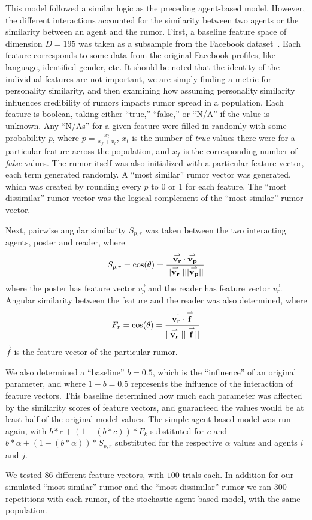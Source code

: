 This model followed a similar logic as the preceding agent-based model.
However, the different interactions accounted for the similarity between two agents or the similarity between an agent and the rumor.
First, a baseline feature space of dimension $ D = 195 $ was taken as a subsample from the Facebook dataset~\cite{mcauley-2014}.
Each feature corresponds to some data from the original Facebook profiles, like language, identified gender, etc.
It should be noted that the identity of the individual features are not important, we are simply finding a metric for personality similarity, and then examining how assuming personality similarity influences credibility of rumors impacts rumor spread in a population.
Each feature is boolean, taking either ``true,'' ``false,'' or ``N/A'' if the value is unknown.
Any ``N/As'' for a given feature were filled in randomly with some probability $ p $, where $ p = \frac{x_{t}}{x_{f} + x_{t}} $, $ x_{t} $ is the number of \textit{true} values there were for a particular feature across the population, and $ x_{f} $ is the corresponding number of \textit{false} values.
The rumor itself was also initialized with a particular feature vector, each term generated randomly.
A ``most similar'' rumor vector was generated, which was created by rounding every $ p $ to 0 or 1 for each feature.
The ``most dissimilar'' rumor vector was the logical complement of the ``most similar'' rumor vector.

Next, pairwise angular similarity $ S_{p,r} $ was taken between the two interacting agents, poster and reader, where
$$ S_{p,r} = \cos(\theta) = \frac{\overset{\rightharpoonup}{\mathbf{v_r}}\cdot\overset{\rightharpoonup}{\mathbf{v_p}}}{\lvert\lvert \overset{\rightharpoonup}{\mathbf{v_r}} \rvert\rvert \lvert\lvert \overset{\rightharpoonup}{\mathbf{v_p}} \rvert\rvert} $$ where the poster has feature vector $ \vec{v_p} $ and the reader has feature vector $ \vec{v_r} $.
Angular similarity between the feature and the reader was also determined, where $$ F_r  = \cos(\theta) = \frac{\overset{\rightharpoonup}{\mathbf{v_r}}\cdot\overset{\rightharpoonup}{\mathbf{f}}}{\lvert\lvert \overset{\rightharpoonup}{\mathbf{v_r}} \rvert\rvert \lvert\lvert \overset{\rightharpoonup}{\mathbf{f}} \rvert\rvert} $$ $ \vec{f} $ is the feature vector of the particular rumor.

We also determined a ``baseline'' $ b = 0.5 $, which is the ``influence'' of an original parameter, and where $ 1 - b = 0.5 $ represents the influence of the interaction of feature vectors.
This baseline determined how much each parameter was affected by the similarity scores of feature vectors, and guaranteed the values would be at least half of the original model values.
The simple agent-based model was run again, with $ b*c + (1-(b*c))*F_k $ substituted for $ c $ and $ b*\alpha + (1-(b*\alpha))*S_{p,r} $ substituted for the respective $ \alpha $ values and agents $ i $ and $ j $.

We tested $ 86 $ different feature vectors, with $ 100 $ trials each.
In addition for our simulated ``most similar'' rumor and the ``most dissimilar'' rumor  we ran $ 300 $ repetitions with each rumor, of the stochastic agent based model, with the same population.
